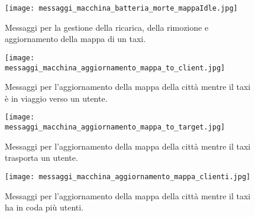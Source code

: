 \begin{figure}[htbp]
	\centering
	\texttt{[image: messaggi\_macchina\_batteria\_morte\_mappaIdle.jpg]}
	\caption{Messaggi per la gestione della ricarica, della rimozione e aggiornamento della mappa di un taxi.}
	\label{fig:messaggi_macchina_batteria_morte_mappaIdle}
\end{figure}

\begin{figure}[htbp]
	\centering
	\texttt{[image: messaggi\_macchina\_aggiornamento\_mappa\_to\_client.jpg]}
	\caption{Messaggi per l'aggiornamento della mappa della città mentre il taxi è in viaggio verso un utente.}
	\label{fig:messaggi_macchina_aggiornamento_mappa_to_client}
\end{figure}

\begin{figure}[htbp]
	\centering
	\texttt{[image: messaggi\_macchina\_aggiornamento\_mappa\_to\_target.jpg]}
	\caption{Messaggi per l'aggiornamento della mappa della città mentre il taxi trasporta un utente.}
	\label{fig:messaggi_macchina_aggiornamento_mappa_to_target}
\end{figure}

\begin{figure}[htbp]
\centering
\texttt{[image: messaggi\_macchina\_aggiornamento\_mappa\_clienti.jpg]}
\caption{Messaggi per l'aggiornamento della mappa della città mentre il taxi ha in coda più utenti.}
\label{fig:messaggi_macchina_aggiornamento_mappa_clienti}
\end{figure}

